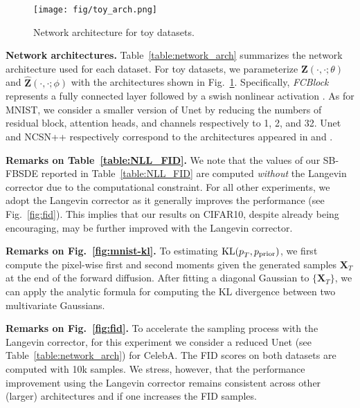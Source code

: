 \documentclass{article}
\def\rvX{{\mathbf{X}}}
\def\rvZ{{\mathbf{Z}}}
\begin{document}
\begin{figure}[t]
  \vskip -0.1in
  \begin{minipage}{\textwidth}
      \centering
      \texttt{[image: fig/toy\_arch.png]}
      \vskip -0.1in
      \caption{
          Network architecture for toy datasets.
      }
      \label{fig:toy_arch}
  \end{minipage}
\end{figure}



\textbf{Network architectures.}
Table~\ref{table:network_arch} summarizes the network architecture used for each dataset.
For toy datasets, we parameterize $\rvZ(\cdot,\cdot;\theta)$ and $\widehat{\rvZ}(\cdot,\cdot;\phi)$ with the architectures shown in Fig.~\ref{fig:toy_arch}.
Specifically, \textit{FCBlock} represents a fully connected layer followed by a swish nonlinear activation \citep{ramachandran2017searching}.
As for MNIST, we consider a smaller version of Unet \citep{ho2020denoising} by reducing
the numbers of residual block, attention heads, and channels respectively to 1, 2, and 32.
Unet and NCSN++ respectively correspond to the architectures appeared in \citet{ho2020denoising} and \citet{song2020score}.

\textbf{Remarks on Table~\ref{table:NLL_FID}.}
We note that the values of our SB-FBSDE reported in Table~\ref{table:NLL_FID} are computed \textit{without} the Langevin corrector due to the computational constraint.
For all other experiments, we adopt the Langevin corrector
as it generally improves the performance (see Fig.~\ref{fig:fid}).
This implies that our results on CIFAR10, despite already being encouraging, may be further improved with the Langevin corrector.


\textbf{Remarks on Fig.~\ref{fig:mnist-kl}.}
To estimating $\mathrm{KL}(p_{T}^{\text{\normalfont{}}}, { p_\text{\normalfont{prior}} })$,
we first compute the pixel-wise first and second moments given the generated samples $\rvX_T$ at the end of the forward diffusion.
After fitting a diagonal Gaussian to $\{\rvX_T\}$,
we can apply the analytic formula for computing the KL divergence between two multivariate Gaussians.

\textbf{Remarks on Fig.~\ref{fig:fid}.}
To accelerate the sampling process with the Langevin corrector,
for this experiment
we consider a reduced Unet (see Table~\ref{table:network_arch}) for CelebA.
The FID scores on both datasets are computed with 10k samples.
We stress, however, that the performance improvement using the Langevin corrector remains consistent across other (larger) architectures and if one increases the FID samples.
\end{document}
